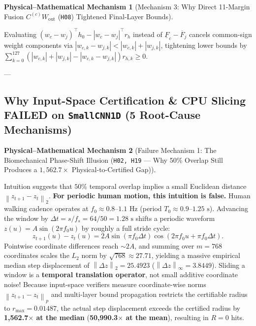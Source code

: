 \documentclass[11pt,a4paper]{article}
\newcommand{\norm}[1]{\left\lVert #1\right\rVert}
\newcommand{\abs}[1]{\left\lvert #1\right\rvert}
\newcommand{\code}[1]{{\small\ttfamily\nolinkurl{#1}}}
\newtheorem{mechanism}{Physical--Mathematical Mechanism}[section]
\begin{document}
\begin{mechanism}[Mechanism 3: Why Direct 11-Margin Fusion $C^{(c)} W_{\text{out}}$ (\code{H08}) Tightened Final-Layer Bounds]
\end{mechanism}
Evaluating $(w_c - w_j)^\top h_0 - \abs{w_c - w_j}^\top r_h$ instead of $\underline{F}_c - \overline{F}_j$ cancels common-sign weight components via $\abs{w_{c,k} - w_{j,k}} < \abs{w_{c,k}} + \abs{w_{j,k}}$, tightening lower bounds by $\sum_{k=0}^{127} (\abs{w_{c,k}} + \abs{w_{j,k}} - \abs{w_{c,k} - w_{j,k}}) r_{h,k} \ge 0$.

---

\subsection{Why Input-Space Certification \& CPU Slicing FAILED on \texttt{SmallCNN1D} (5 Root-Cause Mechanisms)}

\begin{mechanism}[Failure Mechanism 1: The Biomechanical Phase-Shift Illusion (\code{H02, H19} --- Why 50\% Overlap Still Produces a $1,562.7\times$ Physical-to-Certified Gap)]
\end{mechanism}
Intuition suggests that $50\%$ temporal overlap implies a small Euclidean distance $\norm{z_{t+1} - z_t}_2$. \textbf{For periodic human motion, this intuition is false.} Human walking cadence operates at $f_0 \approx 0.8\text{--}1.1\text{ Hz}$ (period $T_0 \approx 0.9\text{--}1.25\text{ s}$). Advancing the window by $\Delta t = s / f_s = 64 / 50 = 1.28\text{ s}$ shifts a periodic waveform $z(u) = A \sin(2\pi f_0 u)$ by roughly a full stride cycle:
\begin{equation}
  z_{t+1}(u) - z_t(u) = 2 A \sin(\pi f_0 \Delta t) \cos\!\left(2\pi f_0 u + \pi f_0 \Delta t\right).
\end{equation}
Pointwise coordinate differences reach $\sim 2A$, and summing over $m = 768$ coordinates scales the $L_2$ norm by $\sqrt{768} \approx 27.71$, yielding a massive empirical median step displacement of $\norm{\Delta z}_2 = 25.4923$ ($\norm{\Delta z}_\infty = 3.8449$). Sliding a window is a \textbf{temporal translation operator}, not small additive coordinate noise! Because input-space verifiers measure coordinate-wise norms $\norm{z_{t+1} - z_t}_p$ and multi-layer bound propagation restricts the certifiable radius to $r_{\max} = 0.01487$, the actual step displacement exceeds the certified radius by \textbf{1,562.7$\times$ at the median} (\textbf{50,990.3$\times$ at the mean}), resulting in $R = 0$ hits.
\end{document}
